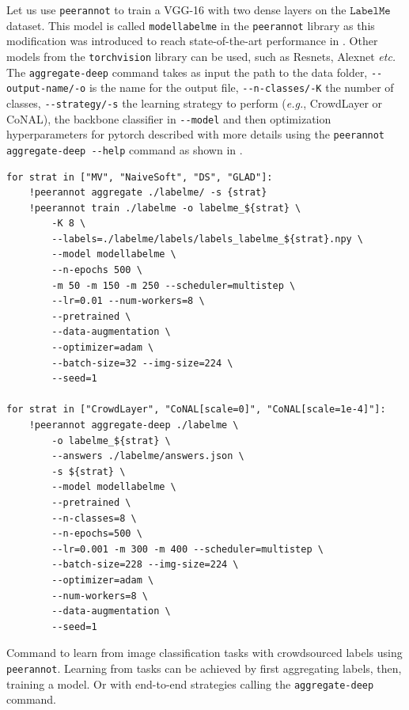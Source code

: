 Let us use \texttt{peerannot} to train a VGG-16 with two dense layers on the $\texttt{LabelMe}$ dataset. This model is called \texttt{modellabelme} in the \texttt{peerannot} library as this modification was introduced to reach state-of-the-art performance in \citet{chu2021learning}.
Other models from the \texttt{torchvision} library can be used, such as Resnets, Alexnet \emph{etc.}
The \texttt{aggregate-deep} command takes as input the path to the data folder, \texttt{-{}-output-name/-o} is the name for the output file, \texttt{-{}-n-classes/-K} the number of classes, \texttt{-{}-strategy/-s} the learning strategy to perform (\emph{e.g.}, CrowdLayer or CoNAL), the backbone classifier in \texttt{-{}-model} and then optimization hyperparameters for pytorch described with more details using the \texttt{peerannot aggregate-deep -{}-help} command as shown in .

\begin{listing}[H]
    \begin{verbatim}
for strat in ["MV", "NaiveSoft", "DS", "GLAD"]:
    !peerannot aggregate ./labelme/ -s {strat}
    !peerannot train ./labelme -o labelme_${strat} \
        -K 8 \
        --labels=./labelme/labels/labels_labelme_${strat}.npy \
        --model modellabelme \
        --n-epochs 500 \
        -m 50 -m 150 -m 250 --scheduler=multistep \
        --lr=0.01 --num-workers=8 \
        --pretrained \
        --data-augmentation \
        --optimizer=adam \
        --batch-size=32 --img-size=224 \
        --seed=1

for strat in ["CrowdLayer", "CoNAL[scale=0]", "CoNAL[scale=1e-4]"]:
    !peerannot aggregate-deep ./labelme \
        -o labelme_${strat} \
        --answers ./labelme/answers.json \
        -s ${strat} \
        --model modellabelme \
        --pretrained \
        --n-classes=8 \
        --n-epochs=500 \
        --lr=0.001 -m 300 -m 400 --scheduler=multistep \
        --batch-size=228 --img-size=224 \
        --optimizer=adam \
        --num-workers=8 \
        --data-augmentation \
        --seed=1
    \end{verbatim}
    \caption{Command to learn from image classification tasks with crowdsourced labels using \texttt{peerannot}. Learning from tasks can be achieved by first aggregating labels, then, training a model. Or with end-to-end strategies calling the \texttt{aggregate-deep} command.}
    \label{lst:learning_peerannot}
\end{listing}

